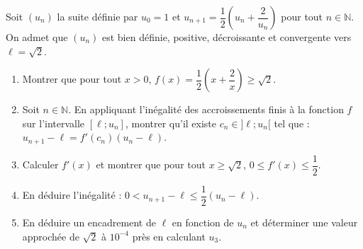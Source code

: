 \documentclass[11pt]{article}
\begin{document}
\begin{exercice}
Soit $(u_n)$ la suite définie par $u_0 = 1$ et $u_{n+1} = \dfrac{1}{2}\left(u_n + \dfrac{2}{u_n}\right)$ pour tout $n \in \mathbb{N}$.
On admet que $(u_n)$ est bien définie, positive, décroissante et convergente vers $\ell = \sqrt{2}$.
\begin{enumerate}
    \item Montrer que pour tout $x > 0$, $f(x) = \dfrac{1}{2}\left(x + \dfrac{2}{x}\right) \geq \sqrt{2}$.
    \item Soit $n \in \mathbb{N}$. En appliquant l'inégalité des accroissements finis à la fonction $f$ sur l'intervalle $[\ell ; u_n]$, montrer qu'il existe $c_n \in ]\ell ; u_n[$ tel que :
    $u_{n+1} - \ell = f'(c_n)(u_n - \ell)$.
    \item Calculer $f'(x)$ et montrer que pour tout $x \geq \sqrt{2}$, $0 \leq f'(x) \leq \dfrac{1}{2}$.
    \item En déduire l'inégalité : $0 < u_{n+1} - \ell \leq \dfrac{1}{2}(u_n - \ell)$.
    \item En déduire un encadrement de $\ell$ en fonction de $u_n$ et déterminer une valeur approchée de $\sqrt{2}$ à $10^{-4}$ près en calculant $u_3$.
\end{enumerate}
\end{exercice}
\end{document}
